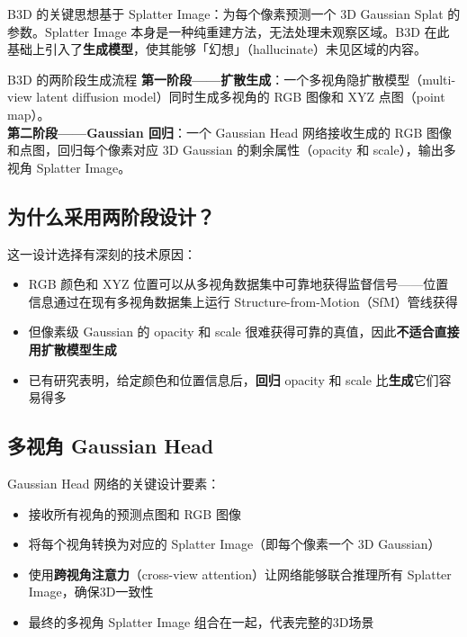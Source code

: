 \documentclass[a4paper]{article}
\begin{document}
B3D 的关键思想基于 Splatter Image：为每个像素预测一个 3D Gaussian Splat 的参数。Splatter Image 本身是一种纯重建方法，无法处理未观察区域。B3D 在此基础上引入了\textbf{生成模型}，使其能够「幻想」（hallucinate）未见区域的内容。

\begin{importantbox}{B3D 的两阶段生成流程}
\textbf{第一阶段——扩散生成}：一个多视角隐扩散模型（multi-view latent diffusion model）同时生成多视角的 RGB 图像和 XYZ 点图（point map）。\\
\textbf{第二阶段——Gaussian 回归}：一个 Gaussian Head 网络接收生成的 RGB 图像和点图，回归每个像素对应 3D Gaussian 的剩余属性（opacity 和 scale），输出多视角 Splatter Image。
\end{importantbox}

\subsection{为什么采用两阶段设计？}

这一设计选择有深刻的技术原因：

\begin{itemize}
    \item RGB 颜色和 XYZ 位置可以从多视角数据集中可靠地获得监督信号——位置信息通过在现有多视角数据集上运行 Structure-from-Motion（SfM）管线获得
    \item 但像素级 Gaussian 的 opacity 和 scale 很难获得可靠的真值，因此\textbf{不适合直接用扩散模型生成}
    \item 已有研究表明，给定颜色和位置信息后，\textbf{回归} opacity 和 scale 比\textbf{生成}它们容易得多
\end{itemize}

\subsection{多视角 Gaussian Head}

Gaussian Head 网络的关键设计要素：

\begin{itemize}
    \item 接收所有视角的预测点图和 RGB 图像
    \item 将每个视角转换为对应的 Splatter Image（即每个像素一个 3D Gaussian）
    \item 使用\textbf{跨视角注意力}（cross-view attention）让网络能够联合推理所有 Splatter Image，确保3D一致性
    \item 最终的多视角 Splatter Image 组合在一起，代表完整的3D场景
\end{itemize}
\end{document}
